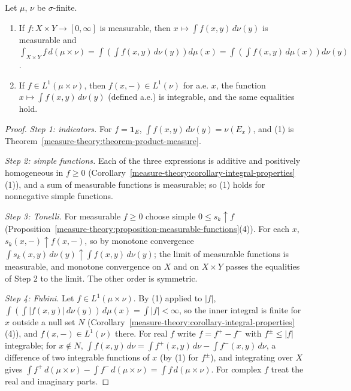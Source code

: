 \begin{theorem}\label{measure-theory:theorem-fubini}
Let $\mu$, $\nu$ be $\sigma$-finite.
\begin{enumerate}
\item If $f \colon X \times Y \to [0, \infty]$ is measurable, then $x \mapsto \int f(x, y)\,d\nu(y)$ is measurable and
$\int_{X \times Y}f\,d(\mu \times \nu) = \int\left(\int f(x, y)\,d\nu(y)\right)d\mu(x) = \int\left(\int f(x, y)\,d\mu(x)\right)d\nu(y)$.
\item If $f \in L^1(\mu \times \nu)$, then $f(x, -) \in L^1(\nu)$ for a.e. $x$, the function $x \mapsto \int f(x, y)\,d\nu(y)$ (defined a.e.) is integrable, and the same equalities hold.
\end{enumerate}
\end{theorem}

\begin{proof}
\emph{Step 1: indicators.} For $f = \mathbf{1}_E$, $\int f(x, y)\,d\nu(y) = \nu(E_x)$, and (1) is Theorem~\ref{measure-theory:theorem-product-measure}.

\emph{Step 2: simple functions.} Each of the three expressions is additive and positively homogeneous in $f \geq 0$ (Corollary~\ref{measure-theory:corollary-integral-properties}(1)), and a sum of
measurable functions is measurable; so (1) holds for nonnegative simple functions.

\emph{Step 3: Tonelli.} For measurable $f \geq 0$ choose simple $0 \leq s_k \uparrow f$ (Proposition~\ref{measure-theory:proposition-measurable-functions}(4)). For each $x$, $s_k(x, -) \uparrow f(x, -)$, so by
monotone convergence $\int s_k(x, y)\,d\nu(y) \uparrow \int f(x, y)\,d\nu(y)$; the limit of measurable functions is measurable, and monotone convergence on $X$ and on $X \times Y$ passes the equalities of
Step 2 to the limit. The other order is symmetric.

\emph{Step 4: Fubini.} Let $f \in L^1(\mu \times \nu)$. By (1) applied to $|f|$, $\int(\int|f(x, y)|\,d\nu(y))\,d\mu(x) = \int|f| < \infty$, so the inner integral is finite for $x$ outside a null set $N$
(Corollary~\ref{measure-theory:corollary-integral-properties}(4)), and $f(x, -) \in L^1(\nu)$ there. For real $f$ write $f = f^+ - f^-$ with $f^\pm \leq |f|$ integrable; for $x \notin N$,
$\int f(x, y)\,d\nu = \int f^+(x, y)\,d\nu - \int f^-(x, y)\,d\nu$, a difference of two integrable functions of $x$ (by (1) for $f^\pm$), and integrating over $X$ gives
$\int f^+\,d(\mu \times \nu) - \int f^-\,d(\mu \times \nu) = \int f\,d(\mu \times \nu)$. For complex $f$ treat the real and imaginary parts.
\end{proof}

